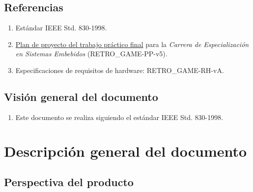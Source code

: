 \documentclass[11pt,a4paper]{article}
\begin{document}
\subsection{Referencias}
\label{sec:org62711e0}

\begin{enumerate}
  \item Estándar IEEE Std. 830-1998.
  \item \href{https://drive.google.com/file/d/1C3vEYR8wME6EzlZVVC-gT2u86dwnoZA-/view?usp=sharing}{Plan de proyecto del trabajo práctico final} para la \textit{Carrera de Especialización en Sistemas Embebidos} (RETRO\_GAME-PP-v5). 
  \item Especificaciones de requisitos de hardware: RETRO\_GAME-RH-vA.
\end{enumerate}


\subsection{Visión general del documento}
\label{sec:orgdaca22c}

\begin{enumerate}
  \item Este documento se realiza siguiendo el estándar IEEE Std. 830-1998.
\end{enumerate}


\section{Descripción general del documento}
\label{sec:orgc1c4017}


\subsection{Perspectiva del producto}
\label{sec:org24980a8}
\end{document}
